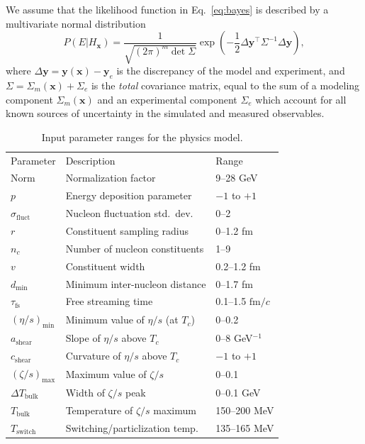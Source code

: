 \documentclass[aps,prc,reprint,amsmath,nofootinbib]{revtex4-1}
\newcommand{\fmc}{\ensuremath{\text{fm}/c}}
\newcommand{\sigmaf}{\sigma_\text{fluct}}
\newcommand{\taufs}{\tau_\text{fs}}
\newcommand{\dmin}{d_\text{min}}
\newcommand{\Tsw}{T_\text{switch}}
\newcommand{\smin}{{(\eta/s)_\mathrm{min}}}
\newcommand{\sslope}{{a_\mathrm{shear}}}
\newcommand{\scrv}{{c_\mathrm{shear}}}
\newcommand{\bmax}{{(\zeta/s)_\mathrm{max}}}
\newcommand{\bloc}{{T_\text{bulk}}}
\newcommand{\bwidth}{{\Delta T_\text{bulk}}}
\newcommand{\xv}{\mathbf x}
\newcommand{\yv}{\mathbf y}
\newcommand{\paddedhline}{\noalign{\smallskip}\hline\noalign{\smallskip}}
\begin{document}
We assume that the likelihood function in Eq.~\eqref{eq:bayes} is described by a multivariate normal distribution
\begin{equation}
  \label{eq:likelihood}
  P(E | H_\xv) = \frac{1}{\sqrt{(2\pi)^m \det \Sigma}} \exp \left ( -\frac{1}{2}\Delta\yv^\intercal \Sigma^{-1} \Delta\yv \right ),
\end{equation}
where $\Delta\yv = \yv(\xv) - \yv_e$ is the discrepancy of the model and experiment, and $\Sigma = \Sigma_m(\xv) + \Sigma_e$ is the \emph{total} covariance matrix, equal to the sum of a modeling component $\Sigma_m(\xv)$ and an experimental component $\Sigma_e$ which account for all known sources of uncertainty in the simulated and measured observables.

\begin{table}[t]
  \caption{Input parameter ranges for the physics model.}
  \begin{ruledtabular}
  \begin{tabular}{lll}
    Parameter         & Description                        & Range             \\
    \paddedhline
    Norm              & Normalization factor                 & 9--28 GeV       \\
    $p$               & Energy deposition parameter         & $-1$ to $+1$     \\
    $\sigmaf$         & Nucleon fluctuation std.\ dev.\      & 0--2            \\
    $r$               & Constituent sampling radius          & 0--1.2 fm       \\
    $n_c$             & Number of nucleon constituents       & 1--9            \\
    $v$               & Constituent width                    & 0.2--1.2 fm     \\
    $\dmin$           & Minimum inter-nucleon distance       & 0--1.7 fm       \\
    $\taufs$          & Free streaming time                  & 0.1--1.5 \fmc   \\
    $\smin$           & Minimum value of $\eta/s$ (at $T_c$) & 0--0.2          \\
    $\sslope$         & Slope of $\eta/s$ above $T_c$        & 0--8 GeV$^{-1}$ \\
    $\scrv$           & Curvature of $\eta/s$ above $T_c$    & $-1$ to $+1$    \\
    $\bmax$           & Maximum value of $\zeta/s$           & 0--0.1          \\
    $\bwidth$         & Width of $\zeta/s$ peak              & 0--0.1 GeV      \\
    $\bloc$           & Temperature of $\zeta/s$ maximum     & 150--200 MeV    \\
    $\Tsw$            & Switching/particlization temp.       & 135--165 MeV    \\
  \end{tabular}
  \end{ruledtabular}
  \label{tab:design}
\end{table}
\end{document}
